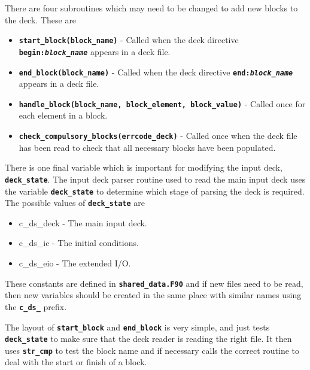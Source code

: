 \documentclass[12pt,a4paper]{article}
\newcommand{\inlinecode}[1]{{\color{warwickred} \bf\texttt{#1}}}
\begin{document}
There are four subroutines which may need to be changed to add new blocks to
the deck. These are
\begin{itemize}
\item \inlinecode{start\_block(block\_name)} - Called when the deck directive
  \inlinecode{begin:{\it block\_name}} appears in a deck file.
\item \inlinecode{end\_block(block\_name)} - Called when the deck directive
  \inlinecode{end:{\it block\_name}} appears in a deck file.
\item \inlinecode{handle\_block(block\_name, block\_element, block\_value)} -
  Called once for each element in a block.
\item \inlinecode{check\_compulsory\_blocks(errcode\_deck)} - Called once when
  the deck file has been read to check that all necessary blocks have been
  populated.
\end{itemize}

There is one final variable which is important for modifying the input deck,
\inlinecode{deck\_state}. The input deck parser routine used to read the main
input deck uses the variable \inlinecode{deck\_state} to
determine which stage of parsing the deck is required. The possible values of
\inlinecode{deck\_state} are

\begin{itemize}
\item c\_ds\_deck - The main input deck.
\item c\_ds\_ic - The initial conditions.
\item c\_ds\_eio - The extended I/O.
\end{itemize}
These constants are defined in \inlinecode{shared\_data.F90} and if new files
need to be read, then new variables should be created in the same place with
similar names using the \inlinecode{c\_ds\_} prefix.

The layout of \inlinecode{start\_block} and \inlinecode{end\_block} is very
simple, and just tests \inlinecode{deck\_state} to make sure that the deck
reader is reading the right file. It then uses \inlinecode{str\_cmp} to test the
block name and if necessary calls the correct routine to deal with the
start or finish of a block.
\end{document}
